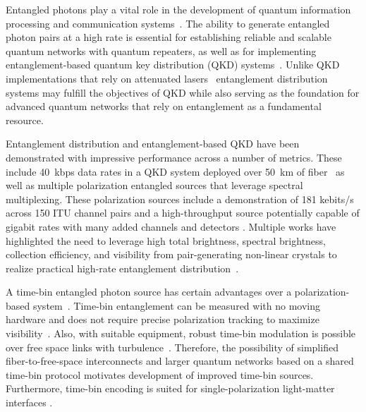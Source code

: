 \documentclass[11pt]{caltech_thesis} %
\begin{document}
Entangled photons play a vital role in the development of quantum information processing and communication systems~\autocite{nielsen2010quantum,ladd2010quantum,gisin2007quantum,pirandola2015advances,briegel1998quantum,kimble2008quantum}. The ability to generate entangled photon pairs at a high rate is essential for establishing reliable and scalable quantum networks with quantum repeaters, as well as for implementing entanglement-based quantum key distribution (QKD) systems~\autocite{Sangouard2011,ma2007quantum,ribordy2000long,yin2017satellite}. Unlike QKD implementations that rely on attenuated lasers~\autocite{sasaki2011field,scarani2009security} entanglement distribution systems may fulfill the objectives of QKD while also serving as the foundation for advanced quantum networks that rely on entanglement as a fundamental resource.

Entanglement distribution and entanglement-based QKD have been demonstrated with impressive performance across a number of metrics. These include 40~kbps data rates in a QKD system deployed over 50~km of fiber~\autocite{Pelet2022} as well as multiple polarization entangled sources that leverage spectral multiplexing. These polarization sources include a demonstration of 181 kebits/s across 150 ITU channel pairs and a high-throughput source potentially capable of gigabit rates with many added channels and detectors \autocite{Alshowkan2022,Neumann2022Entanglement}. Multiple works have highlighted the need to leverage high total brightness, spectral brightness, collection efficiency, and visibility from pair-generating non-linear crystals to realize practical high-rate entanglement distribution~\autocite{Neumann2022Entanglement,atzeni2018integrated,sun2019compact,liu2021device,kaiser2014polarization,anwar2021entangled,neumann2021model}.

A time-bin entangled photon source has certain advantages over a polarization-based system~\autocite{marcikic2002time}. Time-bin entanglement can be measured with no moving hardware and does not require precise polarization tracking to maximize visibility~\autocite{Dong2018PolarizationControll,Fitzke2022TimeBinVsPol}. Also, with suitable equipment, robust time-bin modulation is possible over free space links with turbulence~\autocite{Jin2019}. Therefore, the possibility of simplified fiber-to-free-space interconnects and larger quantum networks based on a shared time-bin protocol motivates development of improved time-bin sources. Furthermore, time-bin encoding is suited for single-polarization light-matter interfaces \autocite{simon2010quantum,lauk2020perspectives}.
\end{document}

